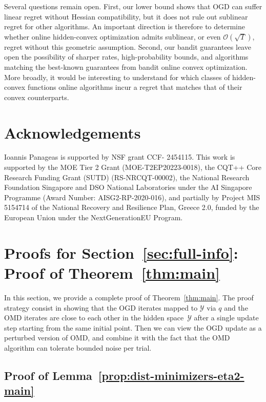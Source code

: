 \documentclass[a4paper,11pt,fullpage]{article}
\def\Y{{\mathcal Y}}
\theoremstyle{plain}
\theoremstyle{definition}
\theoremstyle{plain}
\begin{document}
Several questions remain open. 
First, our lower bound shows that OGD can suffer linear regret without Hessian compatibility, but it does not rule out sublinear regret for other algorithms. 
An important direction is therefore to determine whether online hidden-convex optimization admits sublinear, or even $\mathcal{O}(\sqrt{T})$, regret without this geometric assumption. 
Second, our bandit guarantees leave open the possibility of sharper rates, high-probability bounds, and algorithms matching the best-known guarantees from bandit online convex optimization. 
More broadly, it would be interesting to understand for which classes of hidden-convex functions online algorithms incur a regret that matches that of their convex counterparts.


\section*{Acknowledgements}

Ioannis Panageas is supported by NSF grant CCF- 2454115. This work is supported by the MOE Tier 2 Grant (MOE-T2EP20223-0018),  the CQT++ Core Research Funding Grant (SUTD) (RS-NRCQT-00002), the National Research Foundation Singapore and DSO National Laboratories under the AI Singapore Programme (Award Number: AISG2-RP-2020-016), and partially by Project MIS 5154714 of the National Recovery and Resilience Plan, Greece 2.0, funded by the European Union under the NextGenerationEU Program.




\newpage
\appendix

\tableofcontents

\section{Proofs for Section~\ref{sec:full-info}: Proof of Theorem~\ref{thm:main}}
\label{sec:analysis}


In this section, we provide a complete proof of Theorem~\ref{thm:main}. The proof strategy consist in showing that the OGD iterates mapped to $\Y$ via $q$ and the OMD iterates are close to each other in the hidden space~$\Y$ after a single update step starting from the same initial point. Then we can view the OGD update as a perturbed version of OMD, and combine it with the fact that the OMD algorithm can tolerate bounded noise per trial. 

\subsection{Proof of Lemma~\ref{prop:dist-minimizers-eta2-main}}
\label{appx:proof-main-lemma}
\end{document}
